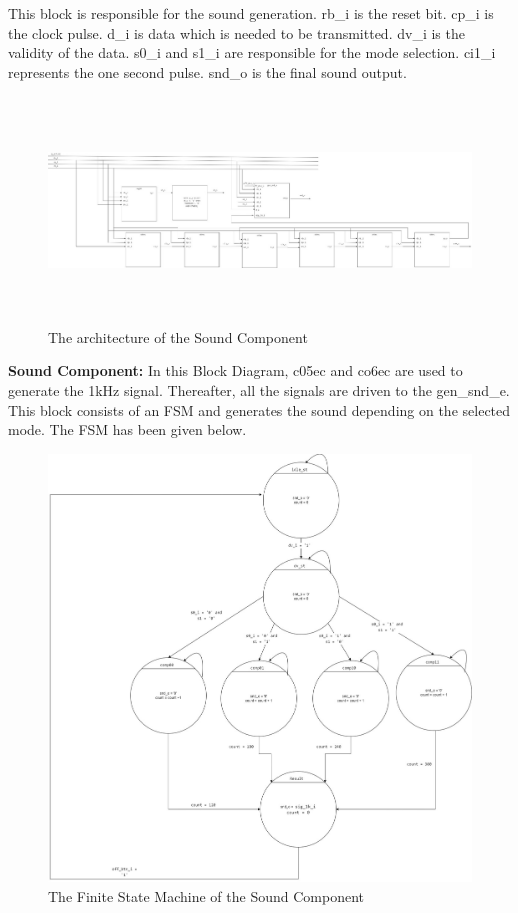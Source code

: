 \documentclass[12pt,a4paper]{article}
\begin{document}
This block is responsible for the sound generation.  rb\_i is the reset bit. cp\_i is the clock pulse. d\_i is data which is needed to be transmitted. dv\_i is the validity of the data. s0\_i and s1\_i are responsible for the mode selection. ci1\_i represents the one second pulse. snd\_o is the final sound output. 













\begin{figure}[H]
\centering
\includegraphics[width=18cm,height=6cm]{new.jpeg}
\caption{The architecture of the Sound Component}
\label{The architecture of the Sound Component}
\end{figure}


\textbf{Sound Component:} In this Block Diagram, c05ec and co6ec are used to generate the 1kHz signal. Thereafter, all the signals are driven to the gen\_snd\_e. This block consists of an FSM and generates the sound depending on the selected mode.
The FSM has been given below. 


\begin{figure}[H]
\centering
\includegraphics[scale=0.35]{FSM.jpeg}
\caption{The Finite State Machine of the Sound Component}
\label{The Finite State Machine of the Sound Component}
\end{figure}
\end{document}
